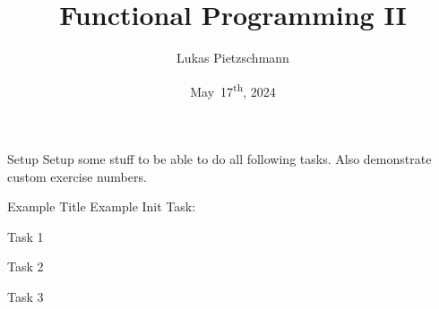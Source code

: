 \documentclass{exercise}
\title{Functional Programming II}
\author{Lukas Pietzschmann}
\institute{Institute of Software Engineering and Programming Languages}
\date{May~17\textsuperscript{th}, 2024}
\begin{document}
	\maketitle

	\begin{exercise}[Exercise 0]{Setup}
		Setup some stuff to be able to do all following tasks. Also demonstrate custom exercise numbers.
	\end{exercise}

	\begin{exercise}{Example Title}
		Example Init Task:
		\begin{tasks}
			\item Task 1
			\item Task 2
			\item Task 3
		\end{tasks}
	\end{exercise}
\end{document}
